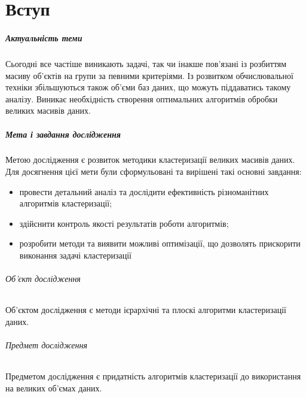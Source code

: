 \chapter*{Вступ}

\paragraph{Актуальність теми}

Сьогодні все частіше виникають задачі, так чи інакше пов'язані із розбиттям масиву об'єктів на групи за певними критеріями. Із розвитком обчислювальної техніки збільшуються також об'єми баз даних, що можуть піддаватись такому аналізу. Виникає необхідність створення оптимальних алгоритмів обробки великих масивів даних.

\paragraph{Мета і завдання дослідження}

Метою дослідження є розвиток методики кластеризації великих масивів даних.
Для досягнення цієї мети були сформульовані та вирішені такі основні завдання:
\begin{itemize}
    \item провести детальний аналіз та дослідити ефективність різноманітних алгоритмів кластеризації;
    \item здійснити контроль якості результатів роботи алгоритмів;
    \item розробити методи та виявити можливі оптимізації, що дозволять прискорити виконання задачі кластеризації
\end{itemize}

\subparagraph{Об'єкт дослідження}
Об'єктом дослідження є методи ієрархічні та плоскі алгоритми кластеризації даних.

\subparagraph{Предмет дослідження}
Предметом дослідження є придатність алгоритмів кластеризації до використання на великих об'ємах даних.
